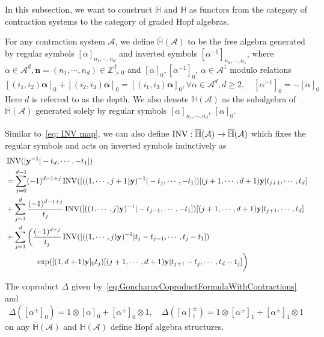 In this subsection, we want to construct $\overline{\mathbb H}$ and $\mathbb H$ as functors from the category of contraction systems to the category of graded Hopf algebras.

\begin{definition}\label{def: free contraction Hopf algebra}\cite{ZDHZ_HopfAlgebrasOfMultiplePolylogarithmsAndHolomorphicOneForms}
For any contraction system $\mathcal A$, we define $\overline{\mathbb H}(\mathcal A)$ to be the free algebra generated by regular symbols $[\alpha]_{n_1,\cdots,n_d}$ and inverted symbols $[\alpha^{-1}]_{n_d,\cdots,n_1}$, where $\alpha\in\mathcal A^d, \mathbf n=(n_1,\cdots,n_d)\in\mathbb Z^d_{>0}$ and $[\alpha]_0, [\alpha^{-1}]_0$, $\alpha\in \mathcal A^1$ modulo relations
\[
[(i_1,i_2)\mathbf\alpha]_{0} + [(i_2,i_3)\mathbf\alpha]_{0} = [(i_1,i_3)\mathbf\alpha]_{0},\forall\alpha\in\mathcal A^d, d\geq2,\quad[\alpha^{-1}]_0=-[\alpha]_0
\]
Here $d$ is referred to as the depth. We also denote $\mathbb H(\mathcal A)$ as the subalgebra of $\overline{\mathbb H}(\mathcal A)$ generated solely by regular symbols $[\alpha]_{n_1,\cdots,n_d}$, $[\alpha]_0$.
\end{definition}

Similar to~\eqref{eq: INV map}, we can also define $\operatorname{INV}:\overline{\mathbb H}(\mathcal A)\to\overline{\mathbb H}(\mathcal A)$ which fixes the regular symbols and acts on inverted symbols inductively as
\begin{equation}
\begin{aligned}
&\operatorname{INV}([\mathbf y^{-1}|-t_d,\cdots,-t_1])\\
&=\sum_{j=0}^{d-1}(-1)^{d-1+j}\operatorname{INV}([((1,\cdots,j+1)\mathbf y)^{-1}|-t_j,\cdots,-t_1])[(j+1,\cdots,d+1)\mathbf y|t_{j+1},\cdots,t_d]\\
&+\sum_{j=1}^d\frac{(-1)^{d-1+j}}{t_j}\operatorname{INV}([((1,\cdots,j)\mathbf y)^{-1}|-t_{j-1},\cdots,-t_1])[(j+1,\cdots,d+1)\mathbf y|t_{j+1},\cdots,t_d]\\
&+\sum_{j=1}^d\bigg(\frac{(-1)^{d+j}}{t_j}\operatorname{INV}([((1,\cdots,j)\mathbf y)^{-1}|t_j-t_{j-1},\cdots,t_j-t_1])\\
&\qquad\qquad\exp([(1,d+1)\mathbf y]_0t_j)[(j+1,\cdots,d+1)\mathbf y|t_{j+1}-t_{j},\cdots,t_d-t_j]\bigg)
\end{aligned}
\end{equation}

\begin{proposition}
The coproduct $\Delta$ given by~\eqref{eq:GoncharovCoproductFormulaWithContractions} and
\[
\Delta([\alpha^{\pm}]_0)=1\otimes[\alpha]_0+[\alpha^{\pm}]_0\otimes1,\quad\Delta([\alpha]^{\pm}_1)=1\otimes[\alpha^{\pm}]_1+[\alpha^{\pm}]_1\otimes1
\]
on any $\overline{\mathbb H}(\mathcal A)$ and $\mathbb H(\mathcal A)$ define Hopf algebra structures.
\end{proposition}

